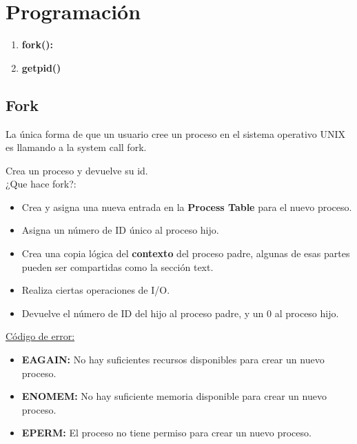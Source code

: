 \documentclass[../main.tex]{subfiles}
\begin{document}
\section{Programación} 
    \begin{enumerate}
        \item \textbf{fork():}
        \item \textbf{getpid()}
    \end{enumerate}
    \subsection{Fork}
        La única forma de que un usuario cree un proceso en el sistema operativo UNIX es llamando a la system call fork.

        Crea un proceso y devuelve su id.\\

        ¿Que hace fork?:
        \begin{itemize}
            \item Crea y asigna una nueva entrada en la \textbf{Process Table} para el nuevo proceso.
            \item Asigna un número de ID único al proceso hijo.
            \item Crea una copia lógica del \textbf{contexto} del proceso padre, algunas de esas partes pueden ser compartidas como la sección text.
            \item Realiza ciertas operaciones de I/O.
            \item Devuelve el número de ID del hijo al proceso padre, y un 0 al proceso hijo.
        \end{itemize}

        \underline{Código de error:}
        \begin{itemize}
            \item \textbf{EAGAIN:} No hay suficientes recursos disponibles para crear un nuevo proceso.
            \item \textbf{ENOMEM:} No hay suficiente memoria disponible para crear un nuevo proceso.
            \item \textbf{EPERM:} El proceso no tiene permiso para crear un nuevo proceso.
        \end{itemize}
\end{document}
